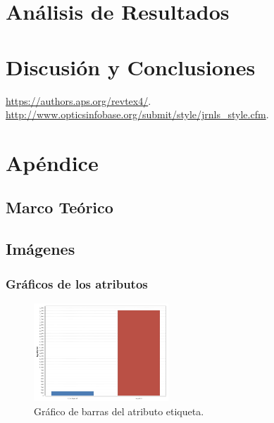 \documentclass[osajnl,twocolumn,showpacs,superscriptaddress,10pt,floatfix]{revtex4-1} %
\begin{document}
\section{Análisis de Resultados}

\section{Discusión y Conclusiones}

\begin{thebibliography}{99}

 \url{https://authors.aps.org/revtex4/}.
 \url{http://www.opticsinfobase.org/submit/style/jrnls_style.cfm}.

\end{thebibliography}

\clearpage

\onecolumngrid

\section{Apéndice} 

\subsection{Marco Teórico} \label{apendix:theory}

\subsection{Imágenes} \label{apendix:images}

\subsubsection{Gráficos de los atributos} \label{apendix:images:attr}

\twocolumngrid

\begin{figure}[H]
    \centering
    \includegraphics[width=0.45\textwidth]{analysis/bars_hypothyroid}
    \caption{Gráfico de barras del atributo etiqueta.}
    \label{figure:bars_hypothyroid}
\end{figure}
\end{document}
